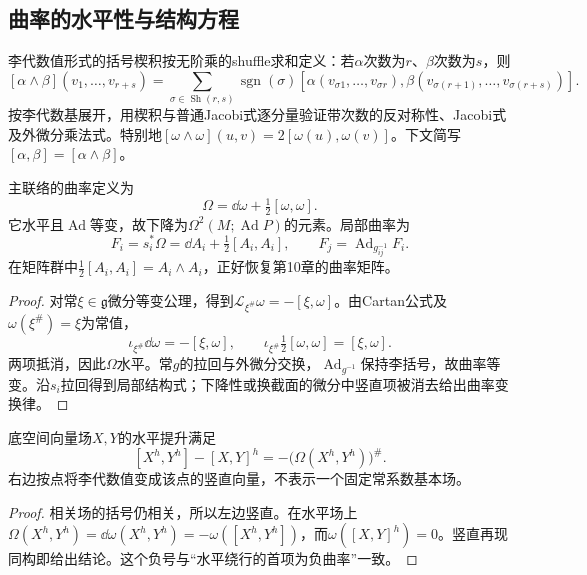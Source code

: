 \subsection{曲率的水平性与结构方程}
李代数值形式的括号楔积按无阶乘的shuffle求和定义：若$\alpha$次数为$r$、$\beta$次数为$s$，则
\[
 [\alpha\wedge\beta](v_1,\ldots,v_{r+s})
 =\sum_{\sigma\in\operatorname{Sh}(r,s)}\operatorname{sgn}(\sigma)
 [\alpha(v_{\sigma1},\ldots,v_{\sigma r}),
   \beta(v_{\sigma(r+1)},\ldots,v_{\sigma(r+s)})].
\]
按李代数基展开，用楔积与普通Jacobi式逐分量验证带次数的反对称性、Jacobi式及外微分乘法式。特别地$[\omega\wedge\omega](u,v)=2[\omega(u),\omega(v)]$。下文简写$[\alpha,\beta]=[\alpha\wedge\beta]$。

\begin{theorem}\label{thm:principal-curvature}
主联络的曲率定义为
\begin{equation}\label{eq:principal-curvature}
 \Omega=\dd\omega+\tfrac12[\omega,\omega].
\end{equation}
它水平且$\operatorname{Ad}$等变，故下降为$\Omega^2(M;\operatorname{Ad}P)$的元素。局部曲率为
\[
 F_i=s_i^*\Omega=\dd A_i+\tfrac12[A_i,A_i],\qquad
 F_j=\operatorname{Ad}_{g_{ij}^{-1}}F_i.
\]
在矩阵群中$\tfrac12[A_i,A_i]=A_i\wedge A_i$，正好恢复第10章的曲率矩阵。
\end{theorem}
\begin{proof}
对常$\xi\in\mathfrak g$微分等变公理，得到$\mathcal L_{\xi^\#}\omega=-[\xi,\omega]$。由Cartan公式及$\omega(\xi^\#)=\xi$为常值，
\[
 \iota_{\xi^\#}\dd\omega=-[\xi,\omega],\qquad
 \iota_{\xi^\#}\tfrac12[\omega,\omega]=[\xi,\omega].
\]
两项抵消，因此$\Omega$水平。常$g$的拉回与外微分交换，$\operatorname{Ad}_{g^{-1}}$保持李括号，故曲率等变。沿$s_i$拉回得到局部结构式；下降性或换截面的微分中竖直项被消去给出曲率变换律。
\end{proof}

\begin{proposition}\label{prop:principal-bracket-curvature}
底空间向量场$X,Y$的水平提升满足
\begin{equation}\label{eq:principal-bracket-curvature}
 [X^h,Y^h]-[X,Y]^h
 =-\bigl(\Omega(X^h,Y^h)\bigr)^\#.
\end{equation}
右边按点将李代数值变成该点的竖直向量，不表示一个固定常系数基本场。
\end{proposition}
\begin{proof}
相关场的括号仍相关，所以左边竖直。在水平场上$\Omega(X^h,Y^h)=\dd\omega(X^h,Y^h)=-\omega([X^h,Y^h])$，而$\omega([X,Y]^h)=0$。竖直再现同构即给出结论。这个负号与“水平绕行的首项为负曲率”一致。
\end{proof}

